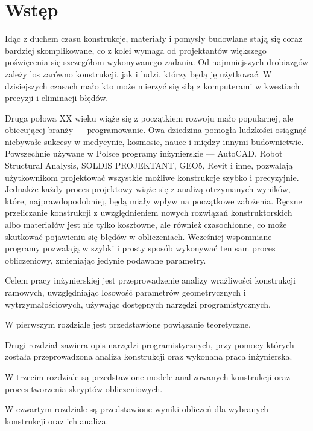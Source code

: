 \newpage
{}
\section*{Wstęp}

Idąc z duchem czasu konstrukcje, materiały i pomysły budowlane stają się coraz bardziej skomplikowane, co z kolei wymaga
od projektantów większego poświęcenia się szczegółom wykonywanego zadania. Od najmniejszych drobiazgów zależy los
zarówno konstrukcji, jak i ludzi, którzy będą ję użytkować. W dzisiejszych czasach mało kto może mierzyć się siłą z
komputerami w kwestiach precyzji i eliminacji błędów.

Druga połowa XX wieku wiąże się z początkiem rozwoju mało popularnej, ale obiecującej branży — programowanie.
Owa dziedzina pomogła ludzkości osiągnąć niebywałe sukcesy w medycynie, kosmosie, nauce i między innymi budownictwie.
Powszechnie używane w Polsce programy inżynierskie — AutoCAD, Robot Structural Analysis, SOLDIS PROJEKTANT, GEO5, Revit i inne,
pozwalają użytkownikom projektować wszystkie możliwe konstrukcje szybko i precyzyjnie. Jednakże każdy proces projektowy wiąże się z
analizą otrzymanych wyników, które, najprawdopodobniej, będą miały wpływ na początkowe założenia. Ręczne przeliczanie konstrukcji z
uwzględnieniem nowych rozwiązań konstruktorskich albo materiałów jest nie tylko kosztowne, ale również czasochłonne, co może skutkować
pojawieniu się błędów w obliczeniach. Wcześniej wspomniane programy pozwalają w szybki i prosty sposób wykonywać ten sam
proces obliczeniowy, zmieniając jedynie podawane parametry.

Celem pracy inżynierskiej jest przeprowadzenie analizy wrażliwości konstrukcji ramowych, uwzględniając losowość
parametrów geometrycznych i wytrzymałościowych, używając dostępnych narzędzi programistycznych.

W pierwszym rozdziale jest przedstawione powiązanie teoretyczne.

Drugi rozdział zawiera opis narzędzi programistycznych, przy pomocy których została przeprowadzona analiza konstrukcji
oraz wykonana praca inżynierska.

W trzecim rozdziale są przedstawione modele analizowanych konstrukcji oraz proces tworzenia skryptów obliczeniowych.

W czwartym rozdziale są przedstawione wyniki obliczeń dla wybranych konstrukcji oraz ich analiza.
